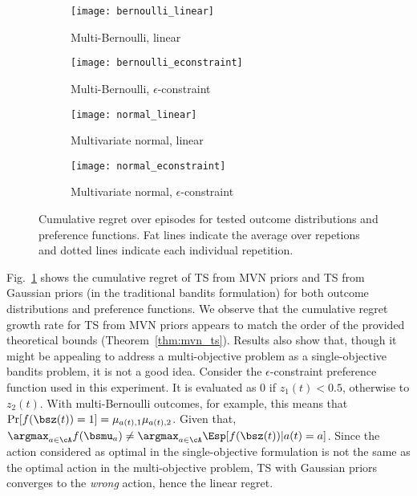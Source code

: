 \begin{figure}[t]
    \centering
    \begin{subfigure}[b]{0.49\textwidth}
        \centering
        \texttt{[image: bernoulli\_linear]}
        \caption{Multi-Bernoulli, linear}
    \end{subfigure}
    \begin{subfigure}[b]{0.49\textwidth}
        \centering
        \texttt{[image: bernoulli\_econstraint]}
        \caption{Multi-Bernoulli, $\epsilon$-constraint}
    \end{subfigure}

    \begin{subfigure}[b]{0.49\textwidth}
        \centering
        \texttt{[image: normal\_linear]}
        \caption{Multivariate normal, linear}
    \end{subfigure}
    \begin{subfigure}[b]{0.49\textwidth}
        \centering
        \texttt{[image: normal\_econstraint]}
        \caption{Multivariate normal, $\epsilon$-constraint}
    \end{subfigure}
    \caption{Cumulative regret over episodes for tested outcome distributions and preference functions. Fat lines indicate the average over repetions and dotted lines indicate each individual repetition.}
\label{fig:experiments:results}
\end{figure}

Fig.~\ref{fig:experiments:results} shows the cumulative regret of TS from MVN priors and TS from Gaussian priors (in the traditional bandits formulation) for both outcome distributions and preference functions. We observe that the cumulative regret growth rate for TS from MVN priors appears to match the order of the provided theoretical bounds (Theorem~\ref{thm:mvn_ts}). Results also show that, though it might be appealing to address a multi-objective problem as a single-objective bandits problem, it is not a good idea. Consider the $\epsilon$-constraint preference function used in this experiment. It is evaluated as 0 if $z_1(t) < 0.5$, otherwise to $z_2(t)$. With multi-Bernoulli outcomes, for example, this means that $\Pr[f(\bsz(t)) = 1] = \mu_{a(t), 1} \mu_{a(t), 2}$. Given that, $\argmax_{a \in \cA} f(\bsmu_a) \neq \argmax_{a \in \cA} \Esp[f(\bsz(t)) | a(t) =a]$. Since the action considered as optimal in the single-objective formulation is not the same as the optimal action in the multi-objective problem, TS with Gaussian priors converges to the \emph{wrong} action, hence the linear regret.

